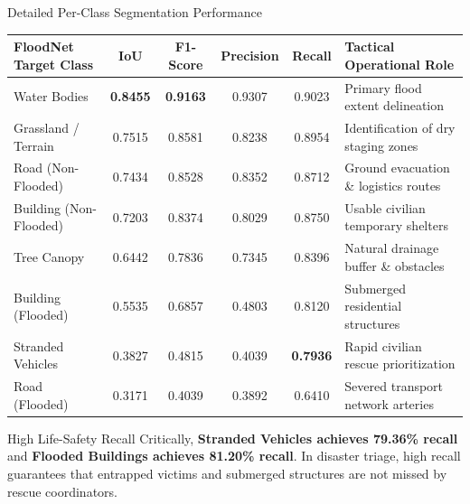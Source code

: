 \documentclass[aspectratio=169, 10pt, professionalfonts]{beamer}
\begin{document}
\begin{frame}{Detailed Per-Class Segmentation Performance}
  \begin{table}[h]
    \scriptsize
    \centering
    \begin{tabularx}{\textwidth}{l C C C C Y}
      \toprule
      \textbf{FloodNet Target Class} & \textbf{IoU} & \textbf{F1-Score} & \textbf{Precision} & \textbf{Recall} & \textbf{Tactical Operational Role} \\
      \midrule
      Water Bodies & \textbf{0.8455} & \textbf{0.9163} & 0.9307 & 0.9023 & Primary flood extent delineation \\
      Grassland / Terrain & 0.7515 & 0.8581 & 0.8238 & 0.8954 & Identification of dry staging zones \\
      Road (Non-Flooded) & 0.7434 & 0.8528 & 0.8352 & 0.8712 & Ground evacuation \& logistics routes \\
      Building (Non-Flooded) & 0.7203 & 0.8374 & 0.8029 & 0.8750 & Usable civilian temporary shelters \\
      Tree Canopy & 0.6442 & 0.7836 & 0.7345 & 0.8396 & Natural drainage buffer \& obstacles \\
      Building (Flooded) & 0.5535 & 0.6857 & 0.4803 & 0.8120 & Submerged residential structures \\
      Stranded Vehicles & 0.3827 & 0.4815 & 0.4039 & \textbf{0.7936} & Rapid civilian rescue prioritization \\
      Road (Flooded) & 0.3171 & 0.4039 & 0.3892 & 0.6410 & Severed transport network arteries \\
      \bottomrule
    \end{tabularx}
  \end{table}

  \begin{block}{High Life-Safety Recall}
    \footnotesize
    Critically, \textbf{Stranded Vehicles achieves 79.36\% recall} and \textbf{Flooded Buildings achieves 81.20\% recall}. In disaster triage, high recall guarantees that entrapped victims and submerged structures are not missed by rescue coordinators.
  \end{block}
\end{frame}
\end{document}
